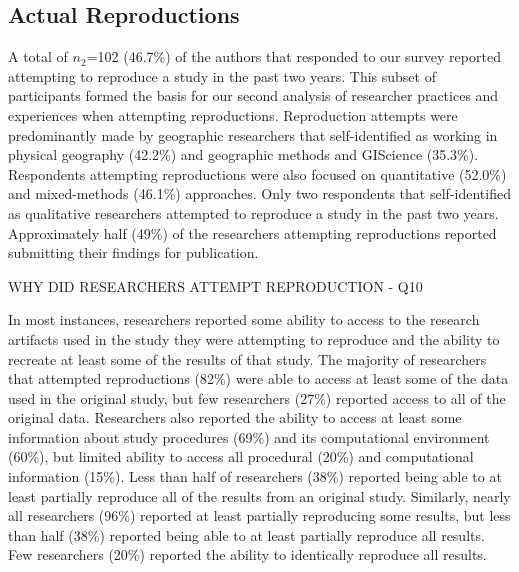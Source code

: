 \documentclass[]{interact}
\theoremstyle{plain}%
\theoremstyle{definition}
\theoremstyle{remark}
\begin{document}
\subsection*{Actual Reproductions}
A total of \textit{$n_{2}$}=102 (46.7\%) of the authors that responded to our survey reported attempting to reproduce a study in the past two years.
This subset of participants formed the basis for our second analysis of researcher practices and experiences when attempting reproductions.
Reproduction attempts were predominantly made by geographic researchers that self-identified as working in physical geography (42.2\%) and geographic methods and GIScience (35.3\%).
Respondents attempting reproductions were also focused on quantitative (52.0\%) and mixed-methods (46.1\%) approaches. 
Only two respondents that self-identified as qualitative researchers attempted to reproduce a study in the past two years.
Approximately half (49\%) of the researchers attempting reproductions reported submitting their findings for publication.

WHY DID RESEARCHERS ATTEMPT REPRODUCTION - Q10

In most instances, researchers reported some ability to access to the research artifacts used in the study they were attempting to reproduce and the ability to recreate at least some of the results of that study.  
The majority of researchers that attempted reproductions (82\%) were able to access at least some of the data used in the original study, but few researchers (27\%) reported access to all of the original data.
Researchers also reported the ability to access at least some information about study procedures (69\%) and its computational environment (60\%), but limited ability to access all procedural (20\%) and computational information (15\%). 
Less than half of researchers (38\%) reported being able to at least partially reproduce all of the results from an original study.
Similarly, nearly all researchers (96\%) reported at least partially reproducing some results, but less than half (38\%) reported being able to at least partially reproduce all results.
Few researchers (20\%) reported the ability to identically reproduce all results.  
\end{document}
